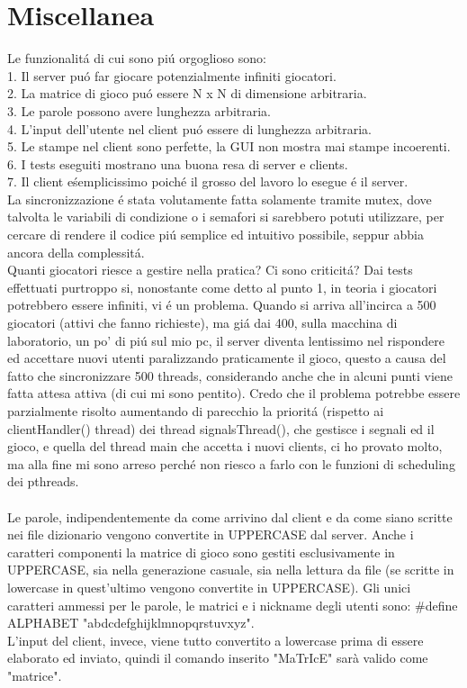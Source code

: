 \chapter{Miscellanea}

Le funzionalit\'a di cui sono pi\'u orgoglioso sono:
\\
1. Il server pu\'o far giocare potenzialmente infiniti giocatori.
\\
2. La matrice di gioco pu\'o essere N x N di dimensione arbitraria.
\\
3. Le parole possono avere lunghezza arbitraria.
\\
4. L'input dell'utente nel client pu\'o essere di lunghezza arbitraria.
\\
5. Le stampe nel client sono perfette, la GUI non mostra mai stampe incoerenti.
\\
6. I tests eseguiti mostrano una buona resa di server e clients.
\\
7. Il client e\' semplicissimo poich\'e il grosso del lavoro lo esegue \'e il server.
\\

La sincronizzazione \'e stata volutamente fatta solamente tramite mutex, dove talvolta le variabili di condizione o i semafori si sarebbero potuti utilizzare, per cercare di rendere il codice pi\'u semplice ed intuitivo possibile, seppur abbia ancora della complessit\'a.
\\
Quanti giocatori riesce a gestire nella pratica? Ci sono criticit\'a? Dai tests effettuati purtroppo si, nonostante come detto al punto 1, in teoria i giocatori potrebbero essere infiniti, vi \'e un problema. Quando si arriva all'incirca a 500 giocatori (attivi che fanno richieste), ma gi\'a dai 400, sulla macchina di laboratorio, un po' di pi\'u sul mio pc, il server diventa lentissimo nel rispondere ed accettare nuovi utenti paralizzando praticamente il gioco, questo a causa del fatto che sincronizzare 500 threads, considerando anche che in alcuni punti viene fatta attesa attiva (di cui mi sono pentito). Credo che il problema potrebbe essere parzialmente risolto aumentando di parecchio la priorit\'a (rispetto ai clientHandler() thread) dei thread signalsThread(), che gestisce i segnali ed il gioco, e quella del thread main che accetta i nuovi clients, ci ho provato molto, ma alla fine mi sono arreso perch\'e non riesco a farlo con le funzioni di scheduling dei pthreads.
 \\
 \\
 Le parole, indipendentemente da come arrivino dal client e da come siano scritte nei file dizionario vengono convertite in UPPERCASE dal server. Anche i caratteri componenti la matrice di gioco sono gestiti esclusivamente in UPPERCASE, sia nella generazione casuale, sia nella lettura da file (se scritte in lowercase in quest'ultimo vengono convertite in UPPERCASE). Gli unici caratteri ammessi per le parole, le matrici e i nickname degli utenti sono: \#define ALPHABET "abdcdefghijklmnopqrstuvxyz".
 \\
 L'input del client, invece, viene tutto convertito a lowercase prima di essere elaborato ed inviato, quindi il comando inserito "MaTrIcE" sarà valido come "matrice".
 
